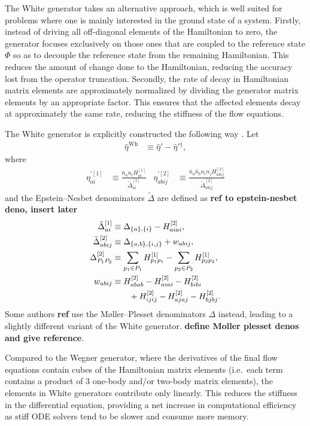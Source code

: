 The White generator takes an alternative approach, which is well
suited for problems where one is mainly interested in the ground state
of a system.  Firstly, instead of driving all off-diagonal elements of
the Hamiltonian to zero, the generator focuses exclusively on those
ones that are coupled to the reference state $\Phi$ so as to decouple
the reference state from the remaining Hamiltonian.  This reduces the
amount of change done to the Hamiltonian, reducing the accuracy lost
from the operator truncation.  Secondly, the rate of decay in
Hamiltonian matrix elements are approximately normalized by dividing
the generator matrix elements by an appropriate factor.  This ensures
that the affected elements decay at approximately the same rate,
reducing the stiffness of the flow equations.

The White generator is explicitly constructed the following way \cite{PhysRevLett.106.222502,White:cond-mat0201346}.  Let
\begin{align*}
\hat{\eta}^{\text{Wh}} &\equiv \hat{\eta}' - \hat{\eta}'{}^\dagger,
\end{align*}
where
\begin{align*}
\eta^{\prime [1]}_{ai} &\equiv \frac{\bar{n}_a n_i H^{[1]}_{ai}}{\tilde{\Delta}^{[1]}_{ai}} &
\eta^{\prime [2]}_{abij} &\equiv \frac{\bar{n}_a \bar{n}_b n_i n_j H^{[2]}_{abij}}{\tilde{\Delta}^{[2]}_{abij}}
\end{align*}
and the Epstein--Nesbet denominators $\tilde{\Delta}$ are defined as {\bf ref to epstein-nesbet deno, insert later}
\begin{align}
\tilde{\Delta}^{[1]}_{ai} &\equiv \Delta_{\{a\}, \{i\}} - H^{[2]}_{aiai}, \notag \\
\tilde{\Delta}^{[2]}_{abij} &\equiv \Delta_{\{a, b\}, \{i, j\}} + w_{abij}, \notag \\
\Delta^{[2]}_{P_1P_2} &\equiv \sum_{p_1 \in P_1} H^{[1]}_{p_1p_1} - \sum_{p_2 \in P_2} H^{[1]}_{p_2p_2}, \label{eq:moellerplessetdenominator} \\
w_{abij}
  &\equiv H^{[2]}_{abab} - H^{[2]}_{aiai} - H^{[2]}_{bibi} \notag \\
  &\qquad + H^{[2]}_{ijij} - H^{[2]}_{ajaj} - H^{[2]}_{bjbj}. \notag
\end{align}
Some authors {\bf ref}  use the M\o ller--Plesset denominators $\Delta$
instead, leading to a slightly different variant of the White
generator.
{\bf define Moller plesset denos and give reference}.

Compared to the Wegner generator, where the derivatives of the final
flow equations contain cubes of the Hamiltonian matrix elements (i.e.\
each term contains a product of 3 one-body and/or two-body matrix
elements), the elements in White generators contribute only linearly.
This reduces the stiffness in the differential equation, providing a
net increase in computational efficiency as stiff ODE solvers tend to
be slower and consume more memory.

